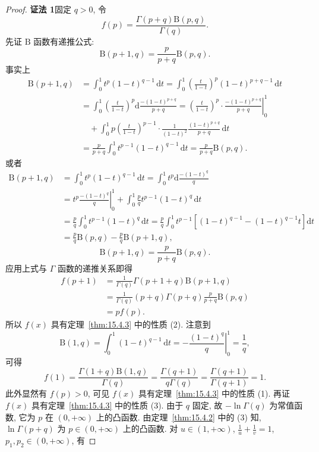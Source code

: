 \begin{proof}
\textbf{证法 1}\quad 固定 $q>0$, 令
\[
  f(p)=\frac{\Gamma(p+q)\mathrm{B}(p,q)}{\Gamma(q)}.
\]
先证 $\mathrm{B}$ 函数有递推公式:
\[
  \mathrm{B}(p+1,q)=\frac{p}{p+q}\mathrm{B}(p,q).
\]
事实上
\[
  \begin{aligned}
    \mathrm{B}(p+1,q)&=\int_{0}^{1}t^{p}(1-t)^{q-1}\,\mathrm{d}t=\int_{0}^{1}\left(\frac{t}{1-t}\right)^{p}(1-t)^{p+q-1}\,\mathrm{d}t\\
    &=\int_{0}^{1}\left(\frac{t}{1-t}\right)^{p}\mathrm{d}\frac{-(1-t)^{p+q}}{p+q}=\left.\left(\frac{t}{1-t}\right)^{p}\cdot\frac{-(1-t)^{p+q}}{p+q}\right|_{0}^{1}\\
    &\quad+\int_{0}^{1}p\left(\frac{t}{1-t}\right)^{p-1}\cdot\frac{1}{(1-t)^{2}}\frac{(1-t)^{p+q}}{p+q}\,\mathrm{d}t\\
    &=\frac{p}{p+q}\int_{0}^{1}t^{p-1}(1-t)^{q-1}\,\mathrm{d}t=\frac{p}{p+q}\mathrm{B}(p,q).
  \end{aligned}
\]
或者
\[
  \begin{aligned}
    \mathrm{B}(p+1,q)&=\int_{0}^{1}t^{p}(1-t)^{q-1}\,\mathrm{d}t=\int_{0}^{1}t^{p}\mathrm{d}\frac{-(1-t)^{q}}{q}\\
    &=\left.t^{p}\frac{-(1-t)^{q}}{q}\right|_{0}^{1}+\int_{0}^{1}\frac{p}{q}t^{p-1}(1-t)^{q}\,\mathrm{d}t\\
    &=\frac{p}{q}\int_{0}^{1}t^{p-1}(1-t)^{q}\,\mathrm{d}t=\frac{p}{q}\int_{0}^{1}t^{p-1}\left[(1-t)^{q-1}-(1-t)^{q-1}t\right]\mathrm{d}t\\
    &=\frac{p}{q}\mathrm{B}(p,q)-\frac{p}{q}\mathrm{B}(p+1,q),
  \end{aligned}
\]
\[
  \mathrm{B}(p+1,q)=\frac{p}{p+q}\mathrm{B}(p,q).
\]
应用上式与 $\Gamma$ 函数的递推关系即得
\[
  \begin{aligned}
    f(p+1)&=\frac{1}{\Gamma(q)}\Gamma(p+1+q)\mathrm{B}(p+1,q)\\
    &=\frac{1}{\Gamma(q)}(p+q)\Gamma(p+q)\frac{p}{p+q}\mathrm{B}(p,q)\\
    &=pf(p).
  \end{aligned}
\]
所以 $f(x)$ 具有定理~\ref{thm:15.4.3} 中的性质 (2). 注意到
\[
  \mathrm{B}(1,q)=\int_{0}^{1}(1-t)^{q-1}\,\mathrm{d}t=-\left.\frac{(1-t)^{q}}{q}\right|_{0}^{1}=\frac{1}{q},
\]
可得
\[
  f(1)=\frac{\Gamma(1+q)\mathrm{B}(1,q)}{\Gamma(q)}=\frac{\Gamma(q+1)}{q\Gamma(q)}=\frac{\Gamma(q+1)}{\Gamma(q+1)}=1.
\]
此外显然有 $f(p)>0$, 可见 $f(x)$ 具有定理~\ref{thm:15.4.3} 中的性质 (1). 再证 $f(x)$ 具有定理~\ref{thm:15.4.3} 中的性质 (3). 由于 $q$ 固定, 故 $-\ln\Gamma(q)$ 为常值函数, 它为 $p$ 在 $(0,+\infty)$ 上的凸函数. 由定理~\ref{thm:15.4.2} 中的 (3) 知, $\ln\Gamma(p+q)$ 为 $p\in(0,+\infty)$ 上的凸函数. 对 $u\in(1,+\infty)$, $\displaystyle\frac{1}{u}+\frac{1}{v}=1$, $p_{1},p_{2}\in(0,+\infty)$, 有

\end{proof}
